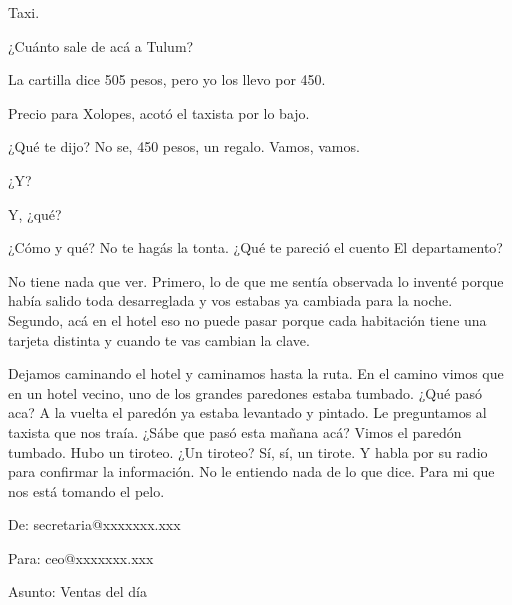 \documentclass[12pt,twoside,openright,a5paper]{book}
\begin{document}
Taxi.

¿Cuánto sale de acá a Tulum?

La cartilla dice 505 pesos, pero yo los llevo por 450.

Precio para Xolopes, acotó el taxista por lo bajo.

¿Qué te dijo? No se, 450 pesos, un regalo. Vamos, vamos.


\vspace{0.5cm}
\hrulefill\hspace{0.2cm} \decofourleft\decofourright \hspace{0.2cm} \hrulefill
\vspace{0.5cm}

¿Y?

Y, ¿qué?

¿Cómo y qué? No te hagás la tonta. ¿Qué te pareció el cuento El
departamento?

No tiene nada que ver. Primero, lo de que me sentía observada lo inventé
porque había salido toda desarreglada y vos estabas ya cambiada para la
noche. Segundo, acá en el hotel eso no puede pasar porque cada habitación
tiene una tarjeta distinta y cuando te vas cambian la clave.


\vspace{0.5cm}
\hrulefill\hspace{0.2cm} \decofourleft\decofourright \hspace{0.2cm} \hrulefill
\vspace{0.5cm}

Dejamos caminando el hotel y caminamos hasta la ruta. En el camino vimos que
en un hotel vecino, uno de los grandes paredones estaba tumbado. ¿Qué pasó
aca? A la vuelta el paredón ya estaba levantado y pintado. Le preguntamos
al taxista que nos traía. ¿Sábe que pasó esta mañana acá? Vimos el
paredón tumbado. Hubo un tiroteo. ¿Un tiroteo? Sí, sí, un tirote. Y
habla por su radio para confirmar la información. No le entiendo nada de
lo que dice. Para mi que nos está tomando el pelo.


\vspace{0.5cm}
\hrulefill\hspace{0.2cm} \decofourleft\decofourright \hspace{0.2cm} \hrulefill
\vspace{0.5cm}

De: secretaria@xxxxxxx.xxx 

Para: ceo@xxxxxxx.xxx 

Asunto: Ventas del día
\end{document}
